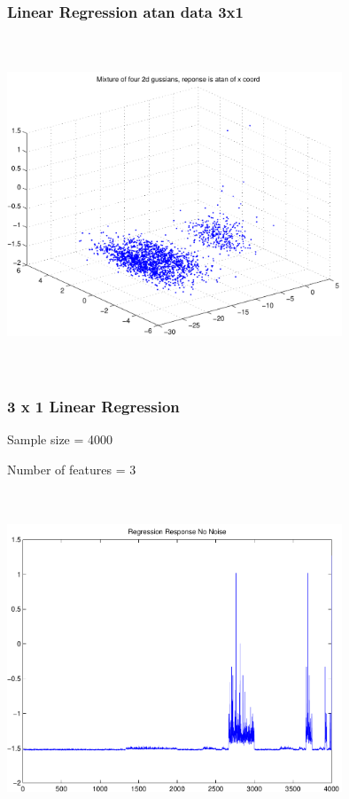 \documentclass[9pt]{article}
\theoremstyle{plain}
\theoremstyle{definition}
\theoremstyle{remark}
\numberwithin{equation}{section}
\begin{document}
\subsubsection{Linear Regression atan data 3x1}
\includegraphics[width=10.0cm,height=10.0cm]{AtanDataSet.pdf}

\subsubsection{3 x 1 Linear Regression}
Sample size = 4000

Number of features = 3

\includegraphics[width=10.0cm,height=10.0cm]{AtanDataSet_regression_response_no_noise.pdf}
\end{document}
